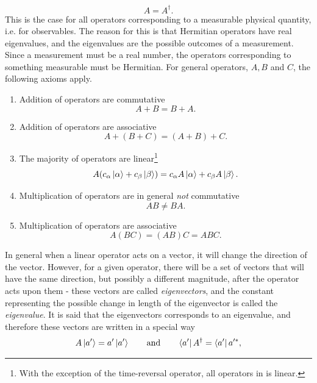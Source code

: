 \begin{equation}
	A=A^\dagger.
\end{equation} 
This is the case for all operators corresponding to a measurable physical quantity, i.e. for observables. The reason for this is that Hermitian operators have real eigenvalues, and the eigenvalues are the possible outcomes of a measurement. Since a measurement must be a real number, the operators corresponding to something measurable must be Hermitian. For general operators, $A, B$ and $C$, the following axioms apply.
\begin{enumerate} 
	\item Addition of operators are commutative
	\begin{equation}
		A+B=B+A.
	\end{equation}  
	\item Addition of operators are associative
	\begin{equation}
		A+(B+C)=(A+B)+C.
	\end{equation} 
	\item The majority of operators are linear\footnote{With the exception of the time-reversal operator, all operators in is linear.}
	\begin{equation}
		A(c_\alpha\ket{\alpha}+c_\beta\ket{\beta})=c_\alpha A\ket{\alpha}+c_\beta A\ket{\beta}.
	\end{equation} 
	\item Multiplication of operators are in general \emph{not} commutative
	\begin{equation}
		AB\neq BA.
	\end{equation} 
	\item Multiplication of operators are associative
	\begin{equation}
		A(BC)=(AB)C=ABC.
	\end{equation} 
\end{enumerate}
In general when a linear operator acts on a vector, it will change the direction of the vector. However, for a given operator, there will be a set of vectors that will have the same direction, but possibly a different magnitude, after the operator acts upon them - these vectors are called \emph{eigenvectors}, and the constant representing the possible change in length of the eigenvector is called the \emph{eigenvalue}. It is said that the eigenvectors corresponds to an eigenvalue, and therefore these vectors are written in a special way
\begin{equation}
	A\ket{a'}=a'\ket{a'} \qquad \mbox{and} \qquad \bra{a'}A^\dagger=\bra{a'}a'^*,
	\label{eig1}
\end{equation} 
